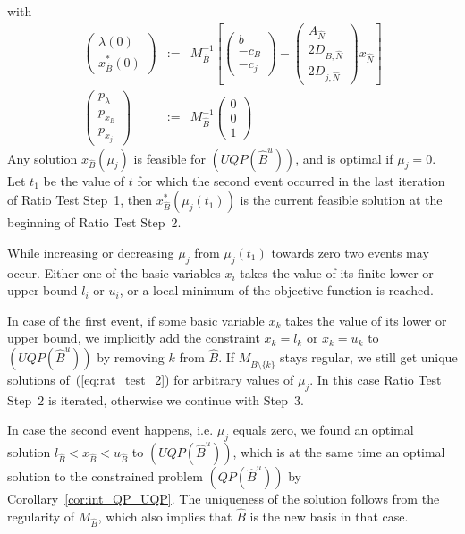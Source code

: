 \documentclass[a4paper]{article}
\begin{document}
with
\begin{eqnarray}
\left(
\begin{array}{c}
\lambda(0) \\
\hline
x_{\hat{B}}^{*}(0)
\end{array}
\right)
&:=&
M_{\hat{B}}^{-1}
\left[
\left(
\begin{array}{c}
b \\
\hline
-c_{B} \\
\hline
-c_{j}
\end{array}
\right)
-
\left(
\begin{array}{c}
A_{\hat{N}} \\
\hline
2D_{B, \hat{N}} \\
\hline
2D_{j, \hat{N}}
\end{array}
\right)
x_{\hat{N}}
\right]
\\
\left(
\begin{array}{c}
p_{\lambda} \\
\hline
p_{x_{B}} \\
\hline
p_{x_{j}}
\end{array}
\right)
&:=&
M_{\hat{B}}^{-1}
\left(
\begin{array}{c}
0 \\
\hline
0 \\
\hline
1
\end{array}
\right)
\end{eqnarray}
Any solution $x_{\hat{B}}(\mu_{j})$ is feasible for $(UQP(\hat{B}^{u}))$, and is
optimal if $\mu_{j}=0$. Let $t_{1}$ be the value of $t$ for which the second
event occurred in the last iteration of Ratio Test Step~1, then
$x_{\hat{B}}^{*}(\mu_{j}(t_{1}))$ is the current feasible solution at the
beginning of Ratio Test Step~2.

While increasing or decreasing $\mu_{j}$ from $\mu_{j}(t_{1})$ towards zero
two events may occur. Either one of the basic variables $x_{i}$
takes the value of its finite lower or upper bound $l_{i}$ or $u_{i}$, or a
local minimum of the objective function is reached.

In case of the first event, if some basic variable $x_{k}$ takes the value of
its lower or upper bound, we implicitly add the constraint $x_{k}=l_{k}$ or
$x_{k}=u_{k}$ to $(UQP(\hat{B}^{u}))$ by removing $k$ from $\hat{B}$. If
$M_{\hat{B}\setminus \{k\}}$ stays regular, we still get unique solutions
of~(\ref{eq:rat_test_2})
for arbitrary values of $\mu_{j}$. In this case Ratio Test Step~2 is iterated,
otherwise we continue with Step~3.  

In case the second event happens, i.e. $\mu_{j}$ equals zero, we found an
optimal solution $l_{\hat{B}} < x_{\hat{B}} < u_{\hat{B}}$
to $(UQP(\hat{B}^{u}))$,
which is at the same time an optimal solution to the constrained problem
$(QP(\hat{B}^{u}))$ by Corollary~\ref{cor:int_QP_UQP}. The uniqueness of the
solution follows from the regularity of $M_{\hat{B}}$, which also implies that
$\hat{B}$ is the new basis in that case.
\end{document}
